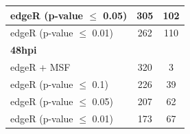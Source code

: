 \documentclass[10pt,a4paper,twocolumn]{article}
\begin{document}
\begin{table}[]
\begin{tabular}{lll}
		\multicolumn{1}{|l|}{edgeR (p-value $\leq$ 0.05)} & \multicolumn{1}{c|}{305}                                             & \multicolumn{1}{c|}{102}              \\ \hline
		\multicolumn{1}{|l|}{edgeR (p-value $\leq$ 0.01)} & \multicolumn{1}{c|}{262}                                             & \multicolumn{1}{c|}{110}              \\ \hline
		\multicolumn{1}{|l|}{\textbf{48hpi}}              & \multicolumn{1}{c|}{}                                                & \multicolumn{1}{c|}{}                 \\ \hline
		\multicolumn{1}{|l|}{edgeR + MSF}                 & \multicolumn{1}{c|}{320}                                             & \multicolumn{1}{c|}{3}                \\ \hline
		\multicolumn{1}{|l|}{edgeR (p-value $\leq$ 0.1)}  & \multicolumn{1}{c|}{226}                                             & \multicolumn{1}{c|}{39}               \\ \hline
		\multicolumn{1}{|l|}{edgeR (p-value $\leq$ 0.05)} & \multicolumn{1}{c|}{207}                                             & \multicolumn{1}{c|}{62}               \\ \hline
		\multicolumn{1}{|l|}{edgeR (p-value $\leq$ 0.01)} & \multicolumn{1}{c|}{173}                                             & \multicolumn{1}{c|}{67}               \\ \hline
	\end{tabular}
\end{table}
\end{document}
